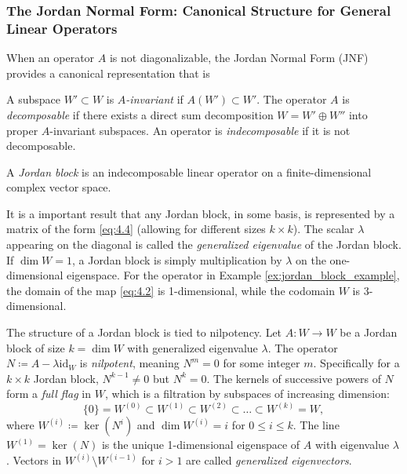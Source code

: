 \subsubsection{The Jordan Normal Form: Canonical Structure for General Linear Operators}
\label{subsec:jnf}

When an operator $A$ is not diagonalizable, the Jordan Normal Form (JNF) provides a canonical representation that is 

\begin{definition}
A subspace $W' \subset W$ is \textit{$A$-invariant} if $A(W') \subset W'$. The operator $A$ is \textit{decomposable} if there exists a direct sum decomposition $W = W' \oplus W''$ into proper $A$-invariant subspaces. An operator is \textit{indecomposable} if it is not decomposable.
\end{definition}

\begin{definition}
A \textit{Jordan block} is an indecomposable linear operator on a finite-dimensional complex vector space.
\end{definition}

It is a important result that any Jordan block, in some basis, is represented by a matrix of the form \eqref{eq:4.4} (allowing for different sizes $k \times k$). The scalar $\lambda$ appearing on the diagonal is called the \textit{generalized eigenvalue} of the Jordan block. If $\dim W = 1$, a Jordan block is simply multiplication by $\lambda$ on the one-dimensional eigenspace. For the operator in Example \ref{ex:jordan_block_example}, the domain of the map \eqref{eq:4.2} is 1-dimensional, while the codomain $W$ is 3-dimensional.

The structure of a Jordan block is tied to nilpotency. Let $A: W \to W$ be a Jordan block of size $k = \dim W$ with generalized eigenvalue $\lambda$. The operator $N \coloneqq A - \lambda \text{id}_W$ is \textit{nilpotent}, meaning $N^m = 0$ for some integer $m$. Specifically for a $k \times k$ Jordan block, $N^{k-1} \neq 0$ but $N^k = 0$. The kernels of successive powers of $N$ form a \textit{full flag} in $W$, which is a filtration by subspaces of increasing dimension:
\begin{equation} \label{eq:4.6}
\{0\} = W^{(0)} \subset W^{(1)} \subset W^{(2)} \subset \dots \subset W^{(k)} = W,
\end{equation}
where $W^{(i)} \coloneqq \ker(N^i)$ and $\dim W^{(i)} = i$ for $0 \le i \le k$. The line $W^{(1)} = \ker(N)$ is the unique 1-dimensional eigenspace of $A$ with eigenvalue $\lambda$. Vectors in $W^{(i)} \setminus W^{(i-1)}$ for $i > 1$ are called \textit{generalized eigenvectors}.

